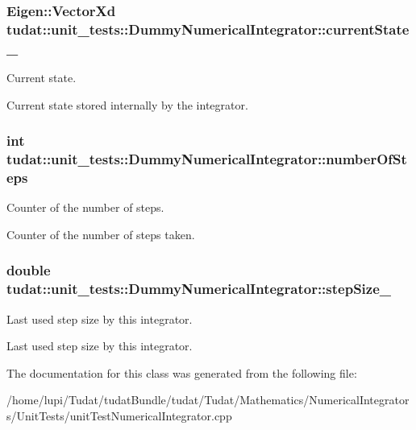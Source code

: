\subsubsection[{\texorpdfstring{current\+State\+\_\+}{currentState_}}]{\setlength{\rightskip}{0pt plus 5cm}Eigen\+::\+Vector\+Xd tudat\+::unit\+\_\+tests\+::\+Dummy\+Numerical\+Integrator\+::current\+State\+\_\+\hspace{0.3cm}{\ttfamily [protected]}}\hypertarget{classtudat_1_1unit__tests_1_1DummyNumericalIntegrator_ab2d46f039013f2f81de5e5d98de6ed64}{}\label{classtudat_1_1unit__tests_1_1DummyNumericalIntegrator_ab2d46f039013f2f81de5e5d98de6ed64}


Current state. 

Current state stored internally by the integrator. 
\subsubsection[{\texorpdfstring{number\+Of\+Steps}{numberOfSteps}}]{\setlength{\rightskip}{0pt plus 5cm}int tudat\+::unit\+\_\+tests\+::\+Dummy\+Numerical\+Integrator\+::number\+Of\+Steps}\hypertarget{classtudat_1_1unit__tests_1_1DummyNumericalIntegrator_a2b2a2f958f57ce022b8bd442a71c62be}{}\label{classtudat_1_1unit__tests_1_1DummyNumericalIntegrator_a2b2a2f958f57ce022b8bd442a71c62be}


Counter of the number of steps. 

Counter of the number of steps taken. 
\subsubsection[{\texorpdfstring{step\+Size\+\_\+}{stepSize_}}]{\setlength{\rightskip}{0pt plus 5cm}double tudat\+::unit\+\_\+tests\+::\+Dummy\+Numerical\+Integrator\+::step\+Size\+\_\+\hspace{0.3cm}{\ttfamily [protected]}}\hypertarget{classtudat_1_1unit__tests_1_1DummyNumericalIntegrator_a27977d4076722219595e7e623bc3c7a1}{}\label{classtudat_1_1unit__tests_1_1DummyNumericalIntegrator_a27977d4076722219595e7e623bc3c7a1}


Last used step size by this integrator. 

Last used step size by this integrator. 

The documentation for this class was generated from the following file\+:\begin{DoxyCompactItemize}
\item 
/home/lupi/\+Tudat/tudat\+Bundle/tudat/\+Tudat/\+Mathematics/\+Numerical\+Integrators/\+Unit\+Tests/unit\+Test\+Numerical\+Integrator.\+cpp\end{DoxyCompactItemize}
